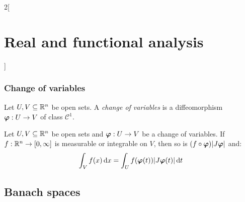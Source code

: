 \documentclass[../../../main_math.tex]{subfiles}
\begin{document}
\begin{multicols}{2}[\section{Real and functional analysis}]
  \subsubsection{Change of variables}
  \begin{definition}
    Let $U,V\subseteq\mathbb{R}^n$ be open sets. A \emph{change of variables} is a diffeomorphism $\boldsymbol{\mathrm{\varphi}}:U\rightarrow V$ of class $\mathcal{C}^1$.
  \end{definition}
  \begin{important}
    \begin{theorem}
      Let $U,V\subseteq\mathbb{R}^n$ be open sets and $\boldsymbol{\mathrm{\varphi}}:U\rightarrow V$ be a change of variables. If $f:\mathbb{R}^n\rightarrow[0,\infty]$ is measurable or integrable on $V$, then so is $(f\circ\boldsymbol{\mathrm{\varphi}})\abs{J\boldsymbol{\mathrm{\varphi}}}$ and: $$\int_{V} f(x)\dd{x}=\int_Uf(\boldsymbol{\mathrm{\varphi}}(t))\abs{J\boldsymbol{\mathrm{\varphi}}(t)}\dd{t}$$
    \end{theorem}
  \end{important}
  \subsection{Banach spaces}

\end{multicols}
\end{document}
